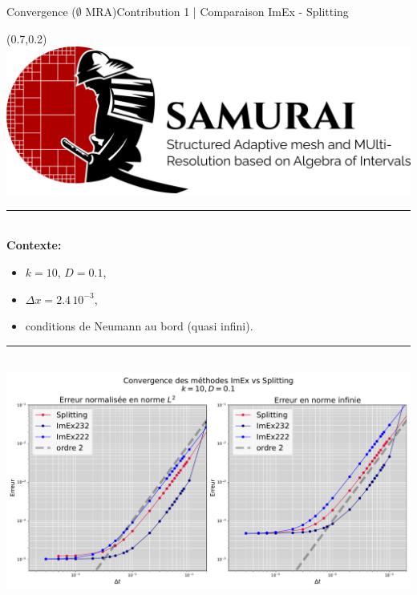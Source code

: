 \begin{frame}{Convergence ($\emptyset$ MRA)}{Contribution 1 | Comparaison ImEx - Splitting}
    \begin{textblock*}{40pt}(0.7\paperwidth,0.2\paperheight)
        \includegraphics[scale=.03]{medias/2_/1_/light_logo.png}
    \end{textblock*}

    \noindent\color{Primary}\rule{\linewidth}{0.6pt}\color{black}\\
    \textbf{Contexte:\\}
    \begin{itemize}
        \item $k=10$, $D=0.1$,
        \item $\Delta x = 2.4 \, 10^{-3}$,
        \item conditions de Neumann au bord (quasi infini).
    \end{itemize}
    \noindent\color{Primary}\rule{\linewidth}{0.6pt}\color{black}\\
    \centering\includegraphics[width =.65 \textwidth]{ medias/2_/1_/ImEx_vs_splitting_k10_D0.1.pdf}
\end{frame}
